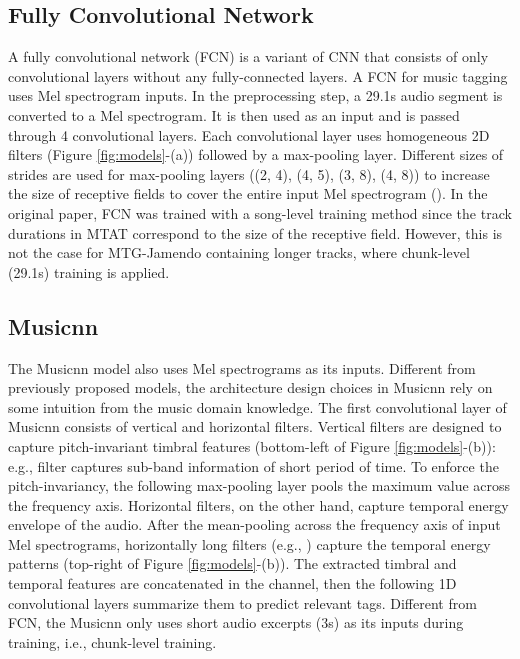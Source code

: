 \documentclass{article}
\begin{document}
\subsection{Fully Convolutional Network}\label{sec:FCN}
A fully convolutional network (FCN) is a variant of CNN that consists of only convolutional layers without any fully-connected layers. A FCN for music tagging \cite{choi2016automatic} uses Mel spectrogram inputs. In the preprocessing step, a 29.1s audio segment is converted to a  Mel spectrogram. It is then used as an input and is passed through 4 convolutional layers. Each convolutional layer uses homogeneous  2D filters (Figure \ref{fig:models}-(a)) followed by a max-pooling layer. Different sizes of strides are used for max-pooling layers ((2, 4), (4, 5), (3, 8), (4, 8)) to increase the size of receptive fields to cover the entire input Mel spectrogram (). In the original paper, FCN was trained with a song-level training method since the track durations in MTAT correspond to the size of the receptive field. 
However, this is not the case for MTG-Jamendo containing longer tracks, where chunk-level (29.1s) training is applied.



\subsection{Musicnn}\label{sec:Musicnn}
The Musicnn \cite{pons2018end} model also uses Mel spectrograms as its inputs. 
Different from previously proposed models, the architecture design choices in Musicnn rely on some intuition from the music domain knowledge.
The first convolutional layer of Musicnn consists of vertical and horizontal filters. Vertical filters are designed to capture pitch-invariant timbral features (bottom-left of Figure \ref{fig:models}-(b)): e.g.,  filter captures sub-band information of short period of time. To enforce the pitch-invariancy, the following max-pooling layer pools the maximum value across the frequency axis. Horizontal filters, on the other hand, capture temporal energy envelope of the audio. 
After the mean-pooling across the frequency axis of input Mel spectrograms, horizontally long filters (e.g., ) capture the temporal energy patterns (top-right of Figure \ref{fig:models}-(b)). The extracted timbral and temporal features are concatenated in the channel, then the following 1D convolutional layers summarize them to predict relevant tags. Different from FCN, the Musicnn only uses short audio excerpts (3s) as its inputs during training, i.e., chunk-level training.
\end{document}
